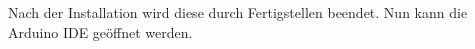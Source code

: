 Nach der Installation wird diese durch Fertigstellen beendet. Nun kann die Arduino IDE geöffnet werden.

%
%
%
%
%
%
%
%
%








